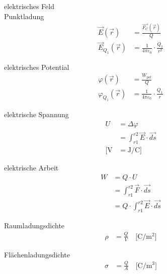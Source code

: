 \begin{karte}{elektrisches Feld\\Punktladung}
    \begin{align*}
        \vec E (\vec r) &= \frac{ \vec{F_C} ( \vec r ) }{Q} \\
        \vec E_{Q_1} (\vec r) &= \frac{1}{4 \pi \varepsilon_0 } \cdot \frac{Q_1}{r^2} 
    \end{align*}
\end{karte}

\begin{karte}{elektrisches Potential}
    \begin{align*}
        \varphi(\vec r) &= \frac{W_{pot}}{Q} \\
        \varphi_{Q_1} (\vec r) &= \frac{1}{4 \pi \varepsilon_0 } \cdot \frac{Q_1}{r} 
    \end{align*}
\end{karte}

\begin{karte}{elektrische Spannung}
    \begin{align*}
        U &= \Delta \varphi \\
          &= \int_{r1}^{r2} \vec E \cdot \vec{ds} \\
        \bigg[ \si{\volt} &= \si{\joule\per\coulomb} \bigg]
    \end{align*}
\end{karte}

\begin{karte}{elektrische Arbeit}
    \begin{align*}
        W &= Q \cdot U \\
          &= \int_{r1}^{r2} \vec F \cdot \vec{ds} \\
          &= Q \cdot \int_{r1}^{r2} \vec E \cdot \vec{ds}
    \end{align*}
\end{karte}

\begin{karte}{Raumladungsdichte}
    \begin{align*}
        \rho &= \frac{Q}{V} \quad \bigg[ \si{\coulomb\per\square\meter} \bigg]
    \end{align*}
\end{karte}

\begin{karte}{Flächenladungsdichte}
    \begin{align*}
        \sigma &= \frac{Q}{A} \quad \bigg[ \si{\coulomb\per\cubic\meter} \bigg]
    \end{align*}
\end{karte}

